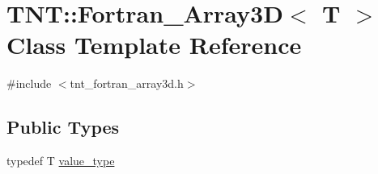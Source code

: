 \hypertarget{classTNT_1_1Fortran__Array3D}{}\section{T\+NT\+:\+:Fortran\+\_\+\+Array3D$<$ T $>$ Class Template Reference}
\label{classTNT_1_1Fortran__Array3D}


{\ttfamily \#include $<$tnt\+\_\+fortran\+\_\+array3d.\+h$>$}

\subsection*{Public Types}
\begin{DoxyCompactItemize}
\item 
typedef T \hyperlink{classTNT_1_1Fortran__Array3D_ac63354327521c0974bb45a9b02a9ff40}{value\+\_\+type}
\end{DoxyCompactItemize}
